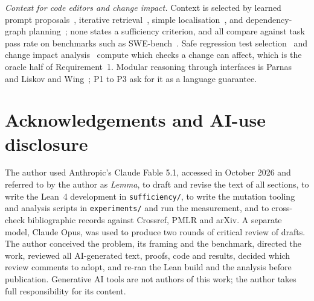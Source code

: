 \documentclass[10pt]{article}
\theoremstyle{definition}
\theoremstyle{plain}
\theoremstyle{remark}
\begin{document}
\emph{Context for code editors and change impact.} Context is selected by learned prompt proposals~\cite{shrivastava2023repo}, iterative retrieval~\cite{zhang2023repocoder}, simple localisation~\cite{xia2025agentless}, and dependency-graph planning~\cite{bairi2024codeplan}; none states a sufficiency criterion, and all compare against task pass rate on benchmarks such as SWE-bench~\cite{jimenez2023swebench}. Safe regression test selection~\cite{rothermel1997safe,gligoric2015practical,legunsen2016extensive} and change impact analysis~\cite{ren2004chianti} compute which checks a change can affect, which is the oracle half of Requirement~1. Modular reasoning through interfaces is Parnas~\cite{parnas1972criteria} and Liskov and Wing~\cite{liskov1994behavioral}; P1 to P3 ask for it as a language guarantee.

\section*{Acknowledgements and AI-use disclosure}

The author used Anthropic's Claude Fable 5.1, accessed in October 2026 and referred to by the author as \emph{Lemma}, to draft and revise the text of all sections, to write the Lean~4 development in \texttt{sufficiency/}, to write the mutation tooling and analysis scripts in \texttt{experiments/} and run the measurement, and to cross-check bibliographic records against Crossref, PMLR and arXiv. A separate model, Claude Opus, was used to produce two rounds of critical review of drafts. The author conceived the problem, its framing and the benchmark, directed the work, reviewed all AI-generated text, proofs, code and results, decided which review comments to adopt, and re-ran the Lean build and the analysis before publication. Generative AI tools are not authors of this work; the author takes full responsibility for its content.

{\small


}
\end{document}
